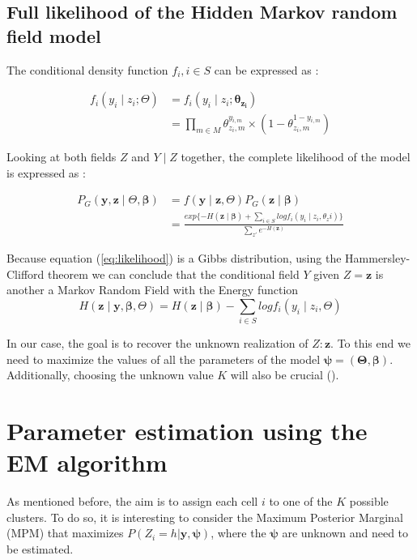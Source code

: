 	\subsection{Full likelihood of the Hidden Markov random field model}

The conditional density function $f_i, i \in S$ can be expressed as :

\begin{align}
f_i(y_i \mid z_i ; \Theta) &= f_i(y_i \mid z_i ; \boldsymbol{\theta_{z_i}}) \nonumber\\ 
&= \prod_{m \in M} \theta_{z_i,m}^{y_{i,m}} \times (1-\theta_{z_i,m}^{1-y_{i,m}})
\end{align}

Looking at both fields $Z$ and $Y \mid Z$ together, the complete likelihood of the model is expressed as :

\begin{align}
\label{eq:likelihood}
P_G(\boldsymbol{y},\boldsymbol{z} \mid \Theta, \boldsymbol{\beta}) &= f(\boldsymbol{y} \mid \boldsymbol{z}, \Theta)P_G(\boldsymbol{z} \mid \boldsymbol{\beta})\nonumber\\
&= \frac{exp\{{-H(\boldsymbol{z} \mid \boldsymbol{\beta})} + \sum\limits_{i \in S}log f_i(y_i \mid z_i, \theta_zi)\}}{\sum\limits_{z'} e^{-H(\boldsymbol{z})}}
\end{align}

Because equation (\ref{eq:likelihood}) is a Gibbs distribution, using the Hammersley-Clifford theorem we can conclude that the conditional field $Y$ given $Z =\boldsymbol{z}$ is another a Markov Random Field with the Energy function 
\[H(\boldsymbol{z} \mid \boldsymbol{y}, \boldsymbol{\beta}, \Theta) = H(\boldsymbol{z} \mid \boldsymbol{\beta}) - \sum\limits_{i \in S} log f_i(y_i \mid z_i, \Theta)\]

In our case, the goal is to recover the unknown realization of $Z: \boldsymbol{z}$. To this end we need to maximize the values of all the parameters of the model $\boldsymbol{\psi} = (\boldsymbol{\Theta}, \boldsymbol{\beta})$. Additionally, choosing the unknown value $K$ will also be crucial ().

\section{Parameter estimation using the EM algorithm}
As mentioned before, the aim is to assign each cell $i$ to one of the $K$ possible clusters. To do so, it is interesting to consider the Maximum Posterior Marginal (MPM) that maximizes $P(Z_{i}=h|\boldsymbol{y}, \boldsymbol{\psi})$, where the $\boldsymbol{\psi}$ are unknown and need to be estimated.\\

